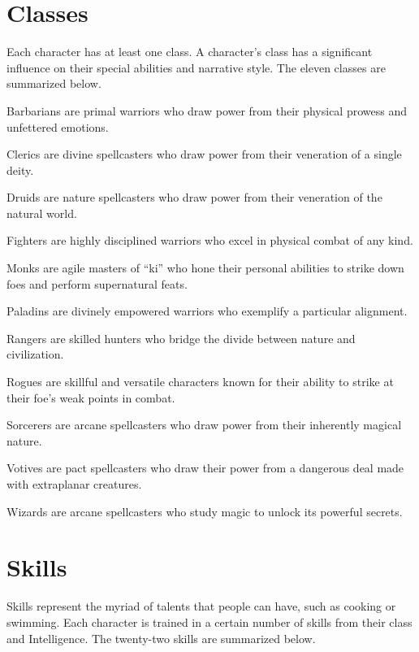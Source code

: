 \section{Classes}
  Each character has at least one class.
  A character's class has a significant influence on their special abilities and narrative style.
  The eleven classes are summarized below.

  \begin{raggeditemize}
    \item Barbarians are primal warriors who draw power from their physical prowess and unfettered emotions.
    \item Clerics are divine spellcasters who draw power from their veneration of a single deity.
    \item Druids are nature spellcasters who draw power from their veneration of the natural world.
    \item Fighters are highly disciplined warriors who excel in physical combat of any kind.
    \item Monks are agile masters of ``ki'' who hone their personal abilities to strike down foes and perform supernatural feats.
    \item Paladins are divinely empowered warriors who exemplify a particular alignment.
    \item Rangers are skilled hunters who bridge the divide between nature and civilization.
    \item Rogues are skillful and versatile characters known for their ability to strike at their foe's weak points in combat.
    \item Sorcerers are arcane spellcasters who draw power from their inherently magical nature.
    \item Votives are pact spellcasters who draw their power from a dangerous deal made with extraplanar creatures.
    \item Wizards are arcane spellcasters who study magic to unlock its powerful secrets.
  \end{raggeditemize}

\section{Skills}
  Skills represent the myriad of talents that people can have, such as cooking or swimming.
  Each character is trained in a certain number of skills from their class and Intelligence.
  The twenty-two skills are summarized below.

